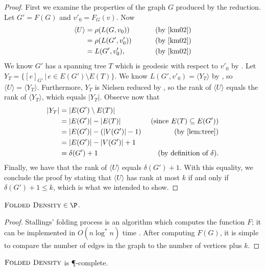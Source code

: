 \documentclass{article}
\newcommand{\FD}{\textsc{Folded Density}}
\newcommand{\gen}[1]{\langle #1 \rangle}
\begin{document}
\begin{proof}
  First we examine the properties of the graph $G$ produced by the reduction.
  Let $G' = F(G)$ and $v'_0 = F_G(v)$.
  Now
  \begin{align*}
    \gen{U} & = \rho(L(G, v_0)) & \qquad \text{ (by \cite[Proposition~3.8]{km02})} \\
            & = \rho(L(G', v'_0)) & \qquad \text{ (by \cite[Lemma~3.4]{km02})} \\
            & = L(G', v'_0), & \qquad \text{ (by \cite[Lemma~2.9]{km02})}
  \end{align*}
  We know $G'$ has a spanning tree $T$ which is geodesic with respect to $v'_0$ by \cite[Lemma~6.6]{km02}.
  Let $Y_T = \{[e]_{G'} \, | \, e \in E(G') \setminus E(T) \}$.
  We know $L(G', v'_0) = \gen{Y_T}$ by \cite[Lemma~6.1]{km02}, so $\gen{U} = \gen{Y_T}$.
  Furthermore, $Y_T$ is Nielsen reduced by \cite[Proposition~6.7]{km02}, so the rank of $\gen{U}$ equals the rank of $\gen{Y_T}$, which equals $|Y_T|$.
  Observe now that
  \begin{align*}
    |Y_T| & = |E(G') \setminus E(T)| & \\
          & = |E(G')| - |E(T)| & \text{ (since } E(T) \subseteq E(G') \text{)} \\
          & = |E(G')| - (|V(G')| - 1) & \text{ (by \autoref{lem:tree})} \\
          & = |E(G')| - |V(G')| + 1 & \\
          & = \delta(G') + 1 & \text{ (by definition of } \delta \text{)}.
  \end{align*}
  Finally, we have that the rank of $\gen{U}$ equals $\delta(G') + 1$.
  With this equality, we conclude the proof by stating that $\gen{U}$ has rank at most $k$ if and only if $\delta(G') + 1 \leq k$, which is what we intended to show.
\end{proof}

\begin{theorem}
  $\FD \in \P$.
\end{theorem}
\begin{proof}
  Stallings' folding process \cite[Algorithm~5.4]{stallings83} is an algorithm which computes the function $F$; it can be implemented in $O(n \log^* n)$ time \cite{touikan06}.
  After computing $F(G)$, it is simple to compare the number of edges in the graph to the number of vertices plus $k$.
\end{proof}

\begin{corollary}
  $\FD$ is \P-complete.
\end{corollary}
\end{document}
